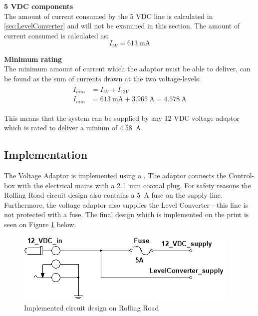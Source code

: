 \textbf{5 VDC components}\\
The amount of current consumed by the 5 VDC line is calculated in \vref{sec:LevelConverter}  and will not be examined in this section. The amount of current consumed is calculated as:
\begin{equation}
	I_{5V} = \SI{613}{\milli \ampere}
\end{equation}

\textbf{Minimum rating}\\
The minimum amount of current which the adaptor must be able to deliver, can be found as the sum of currents drawn at the two voltage-levels:
\begin{align}
	\begin{split}
		I_{min} &= I_{5V} + I_{12V}\\
		I_{min} &= \SI{613}{\milli \ampere} + \SI{3.965}{\ampere} = \SI{4.578}{\ampere}
	\end{split}
\end{align}

This means that the system can be supplied by any 12 VDC voltage adaptor which is rated to deliver a minium of \SI{4.58}{\ampere}.

\subsection{Implementation}
The Voltage Adaptor is implemented  using a . The adaptor connects the Control-box with the electrical mains with a \SI{2.1}{\milli \meter} coaxial plug. For safety reasons the Rolling Road circuit design also contains a \SI{5}{\ampere} fuse on the supply line. Furthermore, the voltage adaptor also supplies the Level Converter - this line is not protected with a fuse. The final design which is implemented on the print is seen on Figure \ref{fig:DesignVoltageAdaptor} below.

\begin{figure}[H]
	\centering
	\includegraphics[width=0.5\linewidth]{Hardware/Pictures/DesignVoltageAdaptor}
	\caption{Implemented circuit design on Rolling Road}
	\label{fig:DesignVoltageAdaptor}
\end{figure}

